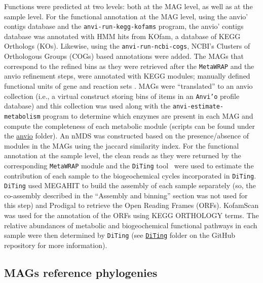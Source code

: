    Functions were predicted at two levels: both at the MAG level, as well as at the sample level. 
   For the functional annotation at the MAG level, using the anvio’ contigs database and the \texttt{anvi-run-kegg-kofams} program, 
   the anvio’ contigs database was annotated with HMM hits from KOfam, a database of KEGG Orthologs (KOs). 
   Likewise, using the \texttt{anvi-run-ncbi-cogs}, NCBI’s Clusters of Orthologous Groups (COGs) based annotations were added. 
   The MAGs that correspond to the refined bins as they were retrieved after the \texttt{MetaWRAP} and the anvio refinement steps, were annotated with KEGG modules; 
   manually defined functional units of gene and reaction sets \citep{kanehisa_kegg_2012}. 
   MAGs were “translated” to an anvio collection (i.e., a virtual construct storing bins of items in an \texttt{Anvi’o} profile database) and this collection was used 
   along with the \texttt{anvi-estimate-metabolism} program to determine which enzymes are present in each MAG and compute the completeness of each metabolic
   module (scripts can be found under the \href{https://github.com/hariszaf/karpathos-swamp/tree/main/anvio}{anvio} folder). 
   An nMDS was constructed based on the presence/absence of modules in the MAGs using the jaccard similarity index. 
   For the functional annotation at the sample level, the clean reads as they were returned by the corresponding \texttt{MetaWRAP} module and the \texttt{DiTing} tool~\citep{xue_diting_2021} 
   were used to estimate the contribution of each sample to the biogeochemical cycles incorporated in \texttt{DiTing}. 
   \texttt{DiTing} used MEGAHIT \citep{li_megahit_2015} to build the assembly of each sample separately (so, the co-assembly described in the “Assembly and binning” section was not used for this step) 
   and Prodigal to retrieve the Open Reading Frames (ORFs). 
   KofamScan \citep{aramaki_kofamkoala_2020} was used for the annotation of the ORFs using KEGG ORTHOLOGY terms. 
   The relative abundances of metabolic and biogeochemical functional pathways in each sample were then determined by \texttt{DiTing} 
   (see \href{https://github.com/hariszaf/karpathos-swamp/tree/main/DiTing}{\texttt{DiTing}} folder on the GitHub repository for more information). 


\subsection{MAGs reference phylogenies}

